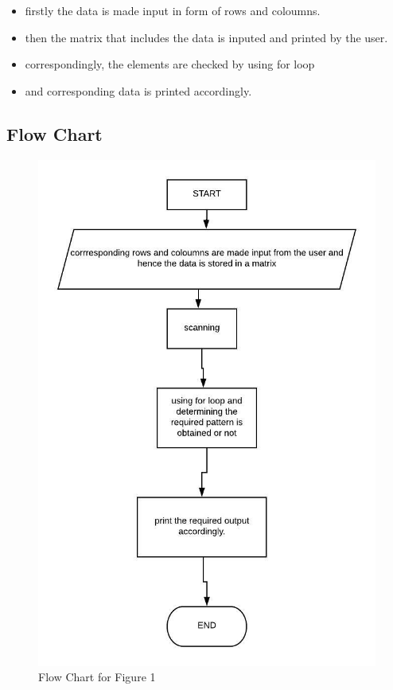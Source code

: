 \documentclass[12pt]{article}
\begin{document}
			\begin{itemize}
				\item firstly the data is made input in form of rows and coloumns.
				\item then the matrix that includes the data is inputed and printed by the user. 
			    \item correspondingly, the elements are checked by using for loop 
			    \item and corresponding data is printed accordingly. 
			 
			\end{itemize}
		
		\subsection{Flow Chart}
		
			\begin{figure}[h!]
				\centering
				\caption{Flow Chart for Figure 1}
				\includegraphics[scale=.8]{ps1f1.jpeg}
			\end{figure}
		
\end{document}

